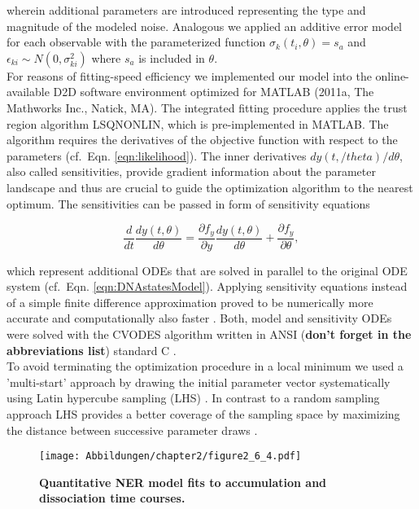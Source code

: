 wherein additional parameters are introduced representing the type and magnitude of the modeled noise. Analogous we applied an additive error model for each observable with the parameterized function $\sigma_{k}(t_i,\theta) = s_a$ and $\epsilon_{ki} \sim N(0,\sigma_{ki}^2)$ where $s_a$ is included in $\theta$.\\ 
For reasons of fitting-speed efficiency we implemented our model into the online-available D2D software environment \cite{Raue2013} optimized for MATLAB (2011a, The Mathworks Inc., Natick, MA). The integrated fitting procedure applies the trust region algorithm LSQNONLIN, which is pre-implemented in MATLAB. The algorithm requires the derivatives of the objective function with respect to the parameters (cf.\ Eqn. \ref{eqn:likelihood}). The inner derivatives $dy(t,/theta)/d\theta$, also called sensitivities, provide gradient information about the parameter landscape and thus are crucial to guide the optimization algorithm to the nearest optimum. The sensitivities can be passed in form of sensitivity equations 

\begin{equation}
	\frac{d}{dt}\frac{dy(t,\theta)}{d\theta} = \frac{\partial f_y}{\partial y}\frac{dy(t,\theta)}{d\theta}+\frac{\partial f_y}{\partial \theta},
\end{equation}  

which represent additional ODEs that are solved in parallel to the original ODE system (cf.\ Eqn. \ref{eqn:DNAstatesModel})\cite{Leis1988}. Applying sensitivity equations instead of a simple finite difference approximation proved to be numerically more accurate and computationally also faster \cite{Raue2013}. Both, model and sensitivity ODEs were solved with the CVODES algorithm written in ANSI (\textbf{don't forget in the abbreviations list}) standard C \cite{Hindmarsh2005}. \\
To avoid terminating the optimization procedure in a local minimum we used a 'multi-start' approach by drawing the initial parameter vector systematically using Latin hypercube sampling (LHS) \cite{Owen2014}. In contrast to a random sampling approach LHS provides a better coverage of the sampling space by maximizing the distance between successive parameter draws \cite{Raue2013}.    

\begin{figure}[htbp]
\begin{center}
\texttt{[image: Abbildungen/chapter2/figure2\_6\_4.pdf]}
\caption{\textbf{Quantitative NER model fits to accumulation and dissociation time courses.}  }
\label{fig:LHS}
\end{center}
\end{figure} 

